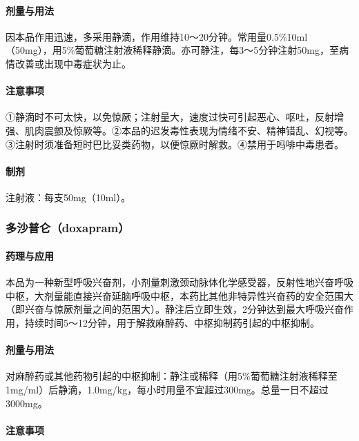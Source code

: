 \paragraph{剂量与用法}

因本品作用迅速，多采用静滴，作用维持10～20分钟。常用量0.5\%10ml（50mg），用5\%葡萄糖注射液稀释静滴。亦可静注，每3～5分钟注射50mg，至病情改善或出现中毒症状为止。

\paragraph{注意事项}

①静滴时不可太快，以免惊厥；注射量大，速度过快可引起恶心、呕吐，反射增强、肌肉震颤及惊厥等。②本品的迟发毒性表现为情绪不安、精神错乱、幻视等。③注射时须准备短时巴比妥类药物，以便惊厥时解救。④禁用于吗啡中毒患者。

\paragraph{制剂}

注射液：每支50mg（10ml）。

\subsubsection{多沙普仑（doxapram）}

\paragraph{药理与应用}

本品为一种新型呼吸兴奋剂，小剂量刺激颈动脉体化学感受器，反射性地兴奋呼吸中枢，大剂量能直接兴奋延脑呼吸中枢，本药比其他非特异性兴奋药的安全范围大（即兴奋与惊厥剂量之间的范围大）。静注后立即生效，2分钟达到最大呼吸兴奋作用，持续时间5～12分钟，用于解救麻醉药、中枢抑制药引起的中枢抑制。

\paragraph{剂量与用法}

对麻醉药或其他药物引起的中枢抑制：静注或稀释（用5\%葡萄糖注射液稀释至1mg/ml）后静滴，1.0mg/kg，每小时用量不宜超过300mg。总量一日不超过3000mg。

\paragraph{注意事项}

